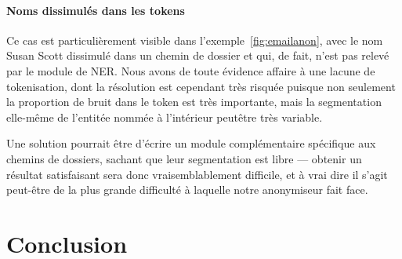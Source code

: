 \documentclass[11pt]{article}
\begin{document}
\paragraph{Noms dissimulés dans les tokens}

Ce cas est particulièrement visible dans l'exemple~\ref{fig:emailanon}, avec le
nom Susan Scott dissimulé dans un chemin de dossier et qui, de fait, n'est pas
relevé par le module de NER. Nous avons de toute évidence affaire à une lacune
de tokenisation, dont la résolution est cependant très risquée puisque non
seulement la proportion de bruit dans le token est très importante, mais la
segmentation elle-même de l'entitée nommée à l'intérieur peutêtre très
variable.

Une solution pourrait être d'écrire un module complémentaire spécifique
aux chemins de dossiers, sachant que leur segmentation est libre --- obtenir un
résultat satisfaisant sera donc vraisemblablement difficile, et à vrai dire il
s'agit peut-être de la plus grande difficulté à laquelle notre anonymiseur fait
face.

\newpage

\section*{Conclusion}



\newpage
\tableofcontents
\end{document}
